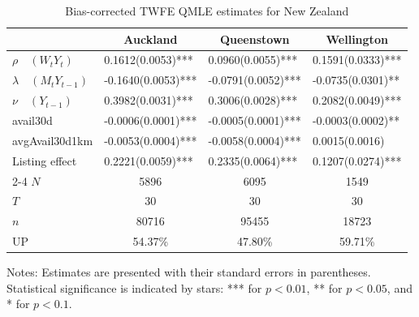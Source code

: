 \documentclass[11pt,a4paper]{article}
\begin{document}
\begin{table}[H]
\centering
\caption{Bias-corrected TWFE QMLE estimates for New Zealand}\label{Tab_Comv_TWFE}
\begin{tabular}{llll}
\hline
\multicolumn{1}{c}{} & \multicolumn{1}{c}{Auckland} & \multicolumn{1}{c}{Queenstown} & \multicolumn{1}{c}{Wellington} \\
\hline
$\rho \quad (W_tY_t)$ & \phantom{-}0.1612(0.0053)*** & \phantom{-}0.0960(0.0055)*** & \phantom{-}0.1591(0.0333)*** \\
$\lambda \quad (M_tY_{t-1})$ & -0.1640(0.0053)*** & -0.0791(0.0052)*** & -0.0735(0.0301)** \\
$\nu \quad (Y_{t-1})$ & \phantom{-}0.3982(0.0031)*** & \phantom{-}0.3006(0.0028)*** & \phantom{-}0.2082(0.0049)*** \\
avail30d & -0.0006(0.0001)*** & -0.0005(0.0001)*** & -0.0003(0.0002)** \\
avgAvail30d1km & -0.0053(0.0004)*** & -0.0058(0.0004)*** & \phantom{-}0.0015(0.0016) \\
Listing effect & \phantom{-}0.2221(0.0059)*** & \phantom{-}0.2335(0.0064)*** & \phantom{-}0.1207(0.0274)*** \\
\cline{2-4}
$N$ & \multicolumn{1}{c}{5896} & \multicolumn{1}{c}{6095} & \multicolumn{1}{c}{1549} \\
$T$ & \multicolumn{1}{c}{30} & \multicolumn{1}{c}{30} & \multicolumn{1}{c}{30} \\
$n$ & \multicolumn{1}{c}{80716} & \multicolumn{1}{c}{95455} & \multicolumn{1}{c}{18723} \\
UP & \multicolumn{1}{c}{54.37\%} & \multicolumn{1}{c}{47.80\%} & \multicolumn{1}{c}{59.71\%} \\
\hline
\end{tabular}
\begin{flushleft}
\footnotesize
Notes: Estimates are presented with their standard errors in parentheses. Statistical significance is indicated by stars: *** for $p<0.01$, ** for $p<0.05$, and * for $p<0.1$.
\end{flushleft}
\end{table}
\end{document}
